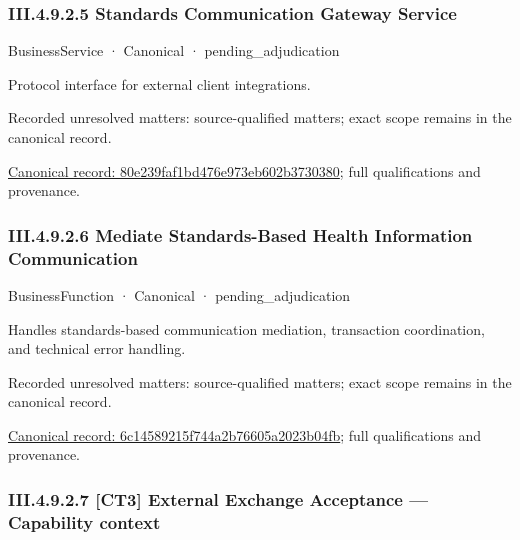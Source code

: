 \subsubsection*{III.4.9.2.5 Standards Communication Gateway Service}
\label{navigation:III.4.9.2.5}

\label{element:80e239faf1bd476e973eb602b3730380}
{\small BusinessService · Canonical · pending\_adjudication}\par

Protocol interface for external client integrations.


{\small Recorded unresolved matters: source-qualified matters; exact scope remains in the canonical record.}\par
{\footnotesize \href{../../../../../../../../continuum/business/business-service/80e239faf1bd476e973eb602b3730380.md}{Canonical record: 80e239faf1bd476e973eb602b3730380}; full qualifications and provenance.}\par
\subsubsection*{III.4.9.2.6 Mediate Standards-Based Health Information Communication}
\label{navigation:III.4.9.2.6}

\label{element:6c14589215f744a2b76605a2023b04fb}
{\small BusinessFunction · Canonical · pending\_adjudication}\par

Handles standards-based communication mediation, transaction coordination, and technical error handling.


{\small Recorded unresolved matters: source-qualified matters; exact scope remains in the canonical record.}\par
{\footnotesize \href{../../../../../../../../continuum/business/business-function/6c14589215f744a2b76605a2023b04fb.md}{Canonical record: 6c14589215f744a2b76605a2023b04fb}; full qualifications and provenance.}\par
\subsubsection*{III.4.9.2.7 [CT3] External Exchange Acceptance — Capability context}
\label{navigation:III.4.9.2.7}

